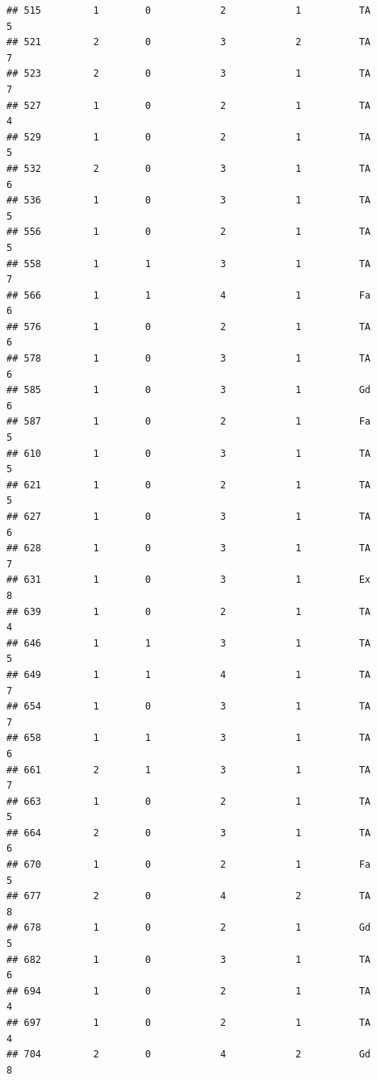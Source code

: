 \documentclass[]{article}
\begin{document}
\begin{verbatim}
## 515         1        0            2            1          TA            5
## 521         2        0            3            2          TA            7
## 523         2        0            3            1          TA            7
## 527         1        0            2            1          TA            4
## 529         1        0            2            1          TA            5
## 532         2        0            3            1          TA            6
## 536         1        0            3            1          TA            5
## 556         1        0            2            1          TA            5
## 558         1        1            3            1          TA            7
## 566         1        1            4            1          Fa            6
## 576         1        0            2            1          TA            6
## 578         1        0            3            1          TA            6
## 585         1        0            3            1          Gd            6
## 587         1        0            2            1          Fa            5
## 610         1        0            3            1          TA            5
## 621         1        0            2            1          TA            5
## 627         1        0            3            1          TA            6
## 628         1        0            3            1          TA            7
## 631         1        0            3            1          Ex            8
## 639         1        0            2            1          TA            4
## 646         1        1            3            1          TA            5
## 649         1        1            4            1          TA            7
## 654         1        0            3            1          TA            7
## 658         1        1            3            1          TA            6
## 661         2        1            3            1          TA            7
## 663         1        0            2            1          TA            5
## 664         2        0            3            1          TA            6
## 670         1        0            2            1          Fa            5
## 677         2        0            4            2          TA            8
## 678         1        0            2            1          Gd            5
## 682         1        0            3            1          TA            6
## 694         1        0            2            1          TA            4
## 697         1        0            2            1          TA            4
## 704         2        0            4            2          Gd            8

\end{verbatim}
\end{document}
